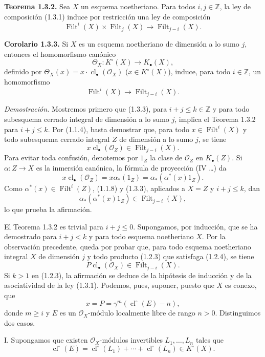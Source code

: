 \documentclass[11pt]{article}
\providecommand{\Filt}{\operatorname{Filt}}
\providecommand{\cl}{\operatorname{cl}}
\begin{document}
\textbf{Teorema 1.3.2.}
Sea $X$ un esquema noetheriano. Para todos $i,j\in\mathbb Z$, la ley de
composición (1.3.1) induce por restricción una ley de composición
\begin{equation}\tag{1.3.3}
\Filt^i(X)\times\Filt_j(X)\longrightarrow\Filt_{j-i}(X).
\end{equation}

\textbf{Corolario 1.3.3.}
Si $X$ es un esquema noetheriano de dimensión a lo sumo $j$, entonces el
homomorfismo canónico
\[
\Theta_X:K^\circ(X)\longrightarrow K_\bullet(X),
\]
definido por $\Theta_X(x)=x\cdot\cl_\bullet(\mathcal O_X)$
($x\in K^\circ(X)$), induce, para todo $i\in\mathbb Z$, un homomorfismo
\[
\Filt^i(X)\longrightarrow\Filt_{j-i}(X).
\]

\emph{Demostración.}
Mostremos primero que (1.3.3), para $i+j\leq k\in\mathbb Z$ y para todo
subesquema cerrado integral de dimensión a lo sumo $j$, implica el Teorema
1.3.2 para $i+j\leq k$. Por (1.1.4), basta demostrar que, para todo
$x\in\Filt^i(X)$ y todo subesquema cerrado integral $Z$ de dimensión a lo
sumo $j$, se tiene
\[
x\cl_\bullet(\mathcal O_Z)\in\Filt_{j-i}(X).
\]
Para evitar toda confusión, denotemos por $1_Z$ la clase de $\mathcal O_Z$ en
$K_\bullet(Z)$. Si $\alpha:Z\to X$ es la inmersión canónica, la fórmula de
proyección (IV \ldots) da
\[
x\cl_\bullet(\mathcal O_Z)
=x\alpha_*(1_Z)
=\alpha_*(\alpha^*(x)1_Z).
\]
Como $\alpha^*(x)\in\Filt^i(Z)$, (1.1.8) y (1.3.3), aplicados a $X=Z$ y
$i+j\leq k$, dan
\[
\alpha_*(\alpha^*(x)1_Z)\in\Filt_{j-i}(X),
\]
lo que prueba la afirmación.

El Teorema 1.3.2 es trivial para $i+j\leq0$. Supongamos, por inducción, que se
ha demostrado para $i+j<k$ y para todo esquema noetheriano $X$. Por la
observación precedente, queda por probar que, para todo esquema noetheriano
integral $X$ de dimensión $j$ y todo producto (1.2.3) que satisfaga (1.2.4),
se tiene
\begin{equation}\tag{1.3.4}
P\cl_\bullet(\mathcal O_X)\in\Filt_{j-i}(X).
\end{equation}
Si $k>1$ en (1.2.3), la afirmación se deduce de la hipótesis de inducción y de
la asociatividad de la ley (1.3.1). Podemos, pues, suponer, puesto que $X$ es
conexo, que
\begin{equation}\tag{1.3.5}
x=P=\gamma^m(\cl^\circ(E)-n),
\end{equation}
donde $m\geq i$ y $E$ es un $\mathcal O_X$-módulo localmente libre de rango
$n>0$. Distinguimos dos casos.

I. Supongamos que existen $\mathcal O_X$-módulos invertibles
$L_1,\ldots,L_n$ tales que
\[
\cl^\circ(E)=\cl^\circ(L_1)+\cdots+\cl^\circ(L_n)\in K^\circ(X).
\]
\end{document}
